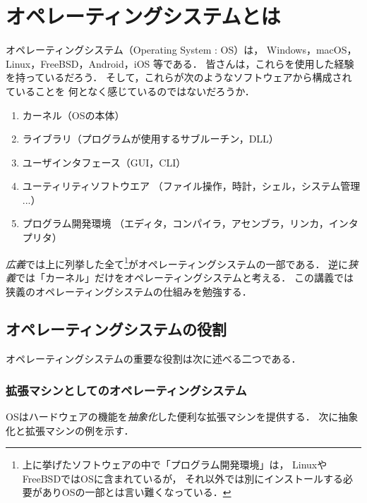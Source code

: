 \chapter{オペレーティングシステムとは}

オペレーティングシステム（Operating System : OS）は，
Windows，macOS，Linux，FreeBSD，Android，iOS
等である．
皆さんは，これらを使用した経験を持っているだろう．
そして，これらが次のようなソフトウェアから構成されていることを
何となく感じているのではないだろうか．

\begin{enumerate}
\item カーネル（OSの本体）
\item ライブラリ（プログラムが使用するサブルーチン，DLL）
\item ユーザインタフェース（GUI，CLI）
\item ユーティリティソフトウエア
  （ファイル操作，時計，シェル，システム管理 ...）
\item プログラム開発環境
  （エディタ，コンパイラ，アセンブラ，リンカ，インタプリタ）
\end{enumerate}

\emph{広義}では上に列挙した全て\footnote{
  上に挙げたソフトウェアの中で「プログラム開発環境」は，
  LinuxやFreeBSDではOSに含まれているが，
  それ以外では別にインストールする必要がありOSの一部とは言い難くなっている．
}がオペレーティングシステムの一部である．
逆に\emph{狭義}では「カーネル」だけをオペレーティングシステムと考える．
この講義では狭義のオペレーティングシステムの仕組みを勉強する．

\section{オペレーティングシステムの役割}
\label{osRole}

オペレーティングシステムの重要な役割は次に述べる二つである．

\subsection{拡張マシンとしてのオペレーティングシステム}
\label{abstruction}

OSはハードウェアの機能を\emph{抽象化}した便利な拡張マシンを提供する．
次に抽象化と拡張マシンの例を示す．

